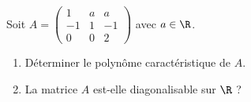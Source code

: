 \begin{enonce}
\begin{exercise}[ID={RMS135 E1417},subtitle={CCINP MP 2024},tags={},difficulty={}]
Soit $A = \begin{pmatrix} 1 & a & a \\ -1 & 1 & -1 \\ 0 & 0 & 2 \end{pmatrix}$ avec $a \in \R$.
\begin{enumerate}
  \item Déterminer le polynôme caractéristique de $A$.
  \item La matrice $A$ est-elle diagonalisable sur $\R$ ?
\end{enumerate}
\end{exercise}
\begin{solution}
\end{solution}
\end{enonce}
